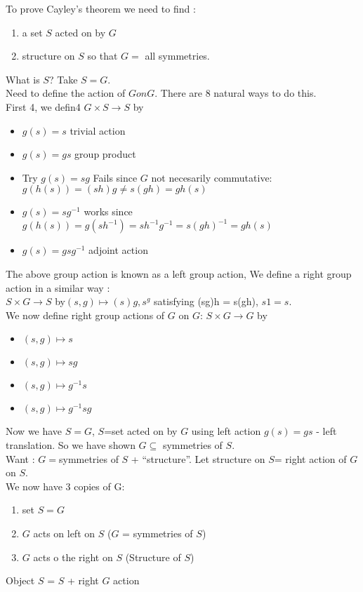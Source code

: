 \noindent 
To prove Cayley's theorem we need to find : 
\begin{enumerate}
    \item a set $S$ acted on by $G$
    \item structure on $S$ so that $G=$ all symmetries.
\end{enumerate}

\noindent
What is $S$? \quad Take $S = G$. \\

\noindent
Need to define the action of $G on G$. There are 8 natural ways to do this. \\
First 4, we defin4 $G \times S \to S$ by 
\begin{itemize}
    \item $g(s)=s$ \quad trivial action 
    \item $g(s) = gs$ \quad group product 
    \item Try $g(s)=sg$ \quad Fails since $G$ not necesarily commutative: $g(h(s)) = (sh)g \neq s(gh) = gh(s)$
    \item $g(s) = sg^{-1}$ \quad works since $g(h(s)) = g(sh^{-1}) = sh^{-1}g^{-1} = s(gh)^{-1} = gh(s)$
    \item $g(s) = gsg^{-1}$ \quad adjoint action 
\end{itemize}

\noindent 
The above group action is known as a left group action, We define a right group action in a similar way : \\
$S \times G \to S$ by$(s,g) \mapsto (s)g, s^g$ satisfying (sg)h = s(gh), $s1 = s$. \\

\noindent
We now define right group actions of $G$ on $G$: $S \times G \to G$ by 
\begin{itemize}
    \item $(s,g) \mapsto s$
    \item $(s,g) \mapsto sg$
    \item $(s,g) \mapsto g^{-1}s$
    \item $(s,g) \mapsto g^{-1}sg$
\end{itemize}

\noindent
Now we have $S=G$, $S$=set acted on by $G$ using left action $g(s) = gs$ - left translation. So we have shown $G \subseteq$ symmetries of $S$. \\

\noindent
Want : $G=$symmetries of $S$ + ``structure''. Let structure on $S$= right action of $G$ on $S$. \\
We now have 3 copies of G: 
\begin{enumerate}
    \item set $S=G$
    \item $G$ acts on left on $S$ \quad ($G$ = symmetries of $S$)
    \item $G$ acts o the right on $S$ \quad (Structure of $S$)
\end{enumerate}
Object $S$ = $S$ + right $G$ action \\

